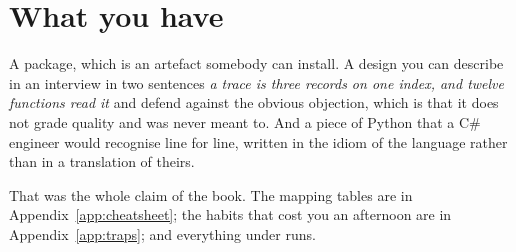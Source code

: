 \section{What you have}
\label{sec:ch14-what}

A package, which is an artefact somebody can install. A design you can
describe in an interview in two sentences \dash{} \emph{a trace is three
records on one index, and twelve functions read it} \dash{} and defend
against the obvious objection, which is that it does not grade quality and
was never meant to. And a piece of Python that a C\# engineer would
recognise line for line, written in the idiom of the language rather than
in a translation of theirs.

That was the whole claim of the book. The mapping tables are in
Appendix~\ref{app:cheatsheet}; the habits that cost you an afternoon are in
Appendix~\ref{app:traps}; and everything under  runs.
